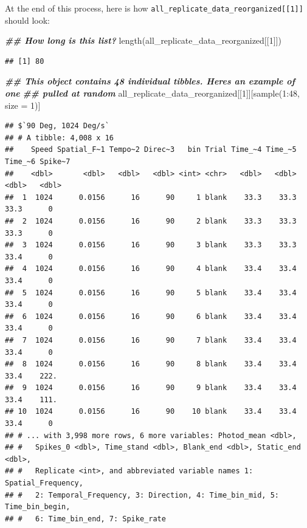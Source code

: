 \documentclass[
]{book}
\newenvironment{Shaded}{\begin{snugshade}}{\end{snugshade}}
\newcommand{\AttributeTok}[1]{\textcolor[rgb]{0.77,0.63,0.00}{#1}}
\newcommand{\DecValTok}[1]{\textcolor[rgb]{0.00,0.00,0.81}{#1}}
\newcommand{\DocumentationTok}[1]{\textcolor[rgb]{0.56,0.35,0.01}{\textbf{\textit{#1}}}}
\newcommand{\FunctionTok}[1]{\textcolor[rgb]{0.00,0.00,0.00}{#1}}
\newcommand{\NormalTok}[1]{#1}
\newcommand{\SpecialCharTok}[1]{\textcolor[rgb]{0.00,0.00,0.00}{#1}}
\begin{document}
At the end of this process, here is how \texttt{all\_replicate\_data\_reorganized{[}{[}1{]}{]}}
should look:

\begin{Shaded}
\begin{Highlighting}[]
\DocumentationTok{\#\# How long is this list?}
\FunctionTok{length}\NormalTok{(all\_replicate\_data\_reorganized[[}\DecValTok{1}\NormalTok{]])}
\end{Highlighting}
\end{Shaded}

\begin{verbatim}
## [1] 80
\end{verbatim}

\begin{Shaded}
\begin{Highlighting}[]
\DocumentationTok{\#\# This object contains 48 individual tibbles. Here\textquotesingle{}s an example of one}
\DocumentationTok{\#\# pulled at random}
\NormalTok{all\_replicate\_data\_reorganized[[}\DecValTok{1}\NormalTok{]][}\FunctionTok{sample}\NormalTok{(}\DecValTok{1}\SpecialCharTok{:}\DecValTok{48}\NormalTok{, }\AttributeTok{size =} \DecValTok{1}\NormalTok{)]}
\end{Highlighting}
\end{Shaded}

\begin{verbatim}
## $`90 Deg, 1024 Deg/s`
## # A tibble: 4,008 x 16
##    Speed Spatial_F~1 Tempo~2 Direc~3   bin Trial Time_~4 Time_~5 Time_~6 Spike~7
##    <dbl>       <dbl>   <dbl>   <dbl> <int> <chr>   <dbl>   <dbl>   <dbl>   <dbl>
##  1  1024      0.0156      16      90     1 blank    33.3    33.3    33.3      0 
##  2  1024      0.0156      16      90     2 blank    33.3    33.3    33.3      0 
##  3  1024      0.0156      16      90     3 blank    33.3    33.3    33.4      0 
##  4  1024      0.0156      16      90     4 blank    33.4    33.4    33.4      0 
##  5  1024      0.0156      16      90     5 blank    33.4    33.4    33.4      0 
##  6  1024      0.0156      16      90     6 blank    33.4    33.4    33.4      0 
##  7  1024      0.0156      16      90     7 blank    33.4    33.4    33.4      0 
##  8  1024      0.0156      16      90     8 blank    33.4    33.4    33.4    222.
##  9  1024      0.0156      16      90     9 blank    33.4    33.4    33.4    111.
## 10  1024      0.0156      16      90    10 blank    33.4    33.4    33.4      0 
## # ... with 3,998 more rows, 6 more variables: Photod_mean <dbl>,
## #   Spikes_0 <dbl>, Time_stand <dbl>, Blank_end <dbl>, Static_end <dbl>,
## #   Replicate <int>, and abbreviated variable names 1: Spatial_Frequency,
## #   2: Temporal_Frequency, 3: Direction, 4: Time_bin_mid, 5: Time_bin_begin,
## #   6: Time_bin_end, 7: Spike_rate
\end{verbatim}
\end{document}
